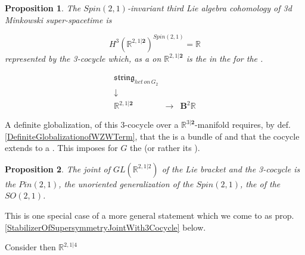 \documentclass[12pt,titlepage]{article}
\newcommand{\itexarray}[1]{\begin{matrix}#1\end{matrix}}
\theoremstyle{plain}
\newtheorem{prop}{Proposition}
\theoremstyle{definition}
\theoremstyle{remark}
\begin{document}
\begin{prop}
\label{}\hypertarget{}{}
The $Spin(2,1)$-invariant third Lie algebra cohomology of 3d Minkowski super-spacetime is

\begin{displaymath}
H^3(\mathbb{R}^{2,1\vert \mathbf{2}})^{Spin(2,1)} = \mathbb{R}
\end{displaymath}
represented by the 3-cocycle which, as a   on $\mathbb{R}^{2,1\vert \mathbf{2}}$ is the  in the  for the .

\begin{displaymath}
\itexarray{
     \mathfrak{string}_{het \, on \, G_2}
     \\
     \downarrow
     \\
     \mathbb{R}^{2,1\vert \mathbf{2}}
      &\stackrel{}{\longrightarrow}&
     \mathbf{B}^2 \mathbb{R}
  }
\end{displaymath}
\end{prop}
A definite globalization, of this 3-cocycle over a $\mathbb{R}^{3\vert \mathbf{2}}$-manifold requires, by def. \ref{DefiniteGlobalizationofWZWTerm}, that the  is a bundle of  and that the cocycle extends to a . This imposes  for $G$ the  (or rather its  ).

\begin{prop}
\label{}\hypertarget{}{}
The joint  of $GL(\mathbb{R}^{2,1\vert 2})$ of the Lie bracket and the 3-cocycle is the  $Pin(2,1)$, the unoriented generalization of the  $Spin(2,1)$, the  of the  $SO(2,1)$.

\end{prop}
This is one special case of a more general statement which we come to as prop. \ref{StabilizerOfSupersymmetryJointWith3Cocycle} below.

Consider then $\mathbb{R}^{2,1\vert 4}$
\end{document}
